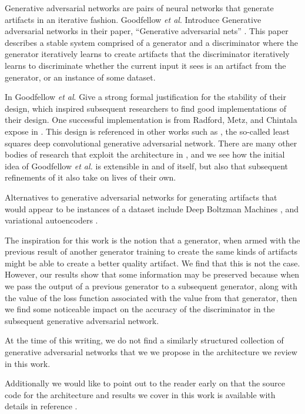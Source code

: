 \documentclass[conference]{IEEEtran}
\begin{document}
Generative adversarial networks are pairs of neural networks that generate
artifacts in an iterative fashion.  Goodfellow \textit{et al}. Introduce
Generative adversarial networks in their paper, ``Generative adversarial nets''
\cite{gan}.  This paper describes a stable system comprised of a generator and a
discriminator where the generator iteratively learns to create artifacts that
the discriminator iteratively learns to discriminate whether the current input
it sees is an artifact from the generator, or an instance of some dataset. 

In \cite{gan} Goodfellow \textit{et al}. Give a strong formal justification for
the stability of their design, which inspired subsequent researchers to find
good implementations of their design.  One successful implementation is from
Radford, Metz, and Chintala expose in \cite{repLearnDcgan}.  This design is
referenced in other works such as \cite{lsgan}, the so-called least squares deep
convolutional generative adversarial network.  There are many other bodies of
research that exploit the architecture in \cite{repLearnDcgan}, and we see how
the initial idea of Goodfellow \textit{et al.} is extensible in and of itself,
but also that subsequent refinements of it also take on lives of their own.

Alternatives to generative adversarial networks for generating artifacts that
would appear to be instances of a dataset include Deep Boltzman Machines
\cite{boltzmann}, and variational autoencoders \cite{varbayes}.

The inspiration for this work is the notion that a generator, when armed with
the previous result of another generator training to create the same kinds of
artifacts might be able to create a better quality artifact.  We find that this
is not the case.  However, our results show that some information may be
preserved because when we pass the output of a previous generator to a
subsequent generator, along with the value of the loss function associated with
the value from that generator, then we find some noticeable impact on the
accuracy of the discriminator in the subsequent generative adversarial network.

At the time of this writing, we do not find a similarly structured collection of
generative adversarial networks that we we propose in the architecture we review
in this work.

Additionally we would like to point out to the reader early on that the source
code for the architecture and results we cover in this work is available with
details in reference \cite{jhcgan}.
\end{document}
